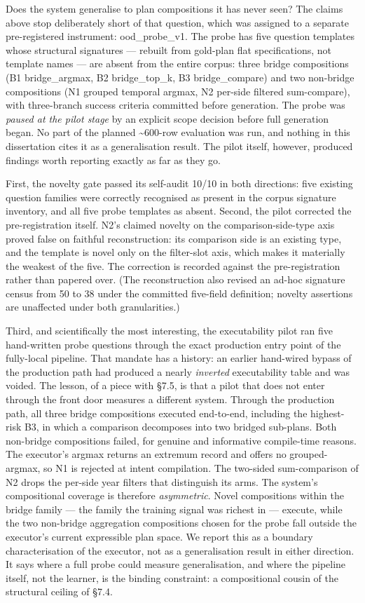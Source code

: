 \documentclass[10pt]{article} %
\begin{document}
Does the system generalise to plan compositions it has never seen? The claims above stop deliberately short of that question, which was assigned to a separate pre-registered instrument: ood\_probe\_v1. The probe has five question templates whose structural signatures --- rebuilt from gold-plan flat specifications, not template names --- are absent from the entire corpus: three bridge compositions (B1 bridge\_argmax, B2 bridge\_top\_k, B3 bridge\_compare) and two non-bridge compositions (N1 grouped temporal argmax, N2 per-side filtered sum-compare), with three-branch success criteria committed before generation. The probe was \emph{paused at the pilot stage} by an explicit scope decision before full generation began. No part of the planned \textasciitilde{}600-row evaluation was run, and nothing in this dissertation cites it as a generalisation result. The pilot itself, however, produced findings worth reporting exactly as far as they go.

First, the novelty gate passed its self-audit 10/10 in both directions: five existing question families were correctly recognised as present in the corpus signature inventory, and all five probe templates as absent. Second, the pilot corrected the pre-registration itself. N2's claimed novelty on the comparison-side-type axis proved false on faithful reconstruction: its comparison side is an existing type, and the template is novel only on the filter-slot axis, which makes it materially the weakest of the five. The correction is recorded against the pre-registration rather than papered over. (The reconstruction also revised an ad-hoc signature census from 50 to 38 under the committed five-field definition; novelty assertions are unaffected under both granularities.)

Third, and scientifically the most interesting, the executability pilot ran five hand-written probe questions through the exact production entry point of the fully-local pipeline. That mandate has a history: an earlier hand-wired bypass of the production path had produced a nearly \emph{inverted} executability table and was voided. The lesson, of a piece with \S7.5, is that a pilot that does not enter through the front door measures a different system. Through the production path, all three bridge compositions executed end-to-end, including the highest-risk B3, in which a comparison decomposes into two bridged sub-plans. Both non-bridge compositions failed, for genuine and informative compile-time reasons. The executor's argmax returns an extremum record and offers no grouped-argmax, so N1 is rejected at intent compilation. The two-sided sum-comparison of N2 drops the per-side year filters that distinguish its arms. The system's compositional coverage is therefore \emph{asymmetric}. Novel compositions within the bridge family --- the family the training signal was richest in --- execute, while the two non-bridge aggregation compositions chosen for the probe fall outside the executor's current expressible plan space. We report this as a boundary characterisation of the executor, not as a generalisation result in either direction. It says where a full probe could measure generalisation, and where the pipeline itself, not the learner, is the binding constraint: a compositional cousin of the structural ceiling of \S7.4.
\end{document}

